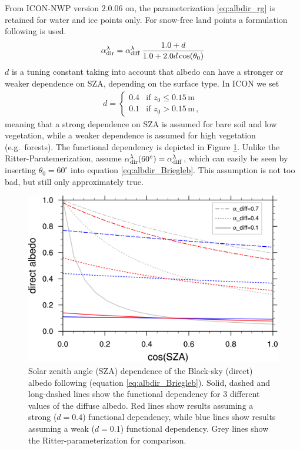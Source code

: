 \documentclass[a4paper,11pt]{article}
\begin{document}
From ICON-NWP version $2.0.06$ on, the parameterization \ref{eq:albdir_rg} is retained for water and ice points 
only. For snow-free land points a formulation following \cite{Briegleb82} is used.
\begin{align}
 \alpha_{\rm dir}^{\lambda} = \alpha_{\rm diff}^{\lambda}\, \frac{1.0 + d}{1.0 + 2.0 d \cos(\theta_{0})}\label{eq:albdir_Briegleb}
\end{align}
$d$ is a tuning constant taking into account that albedo can have a stronger or weaker dependence on SZA, depending on the surface 
type. In ICON we set
\begin{align}
 d= \begin{cases}
     0.4   &  \text{if $z_{0}\leq 0.15\,\mathrm{m}$}\\
     0.1   &  \text{if $z_{0} >  0.15\,\mathrm{m}$}\,,
    \end{cases}
\end{align}
meaning that a strong dependence on SZA is assumed for bare soil and low vegetation, while a weaker dependence is 
assumed for high vegetation (e.g.\ forests). The functional dependency is depicted in Figure \ref{fig:albdir_Briegleb}. 
Unlike the Ritter-Paratemerization, \cite{Briegleb82} assume 
$\alpha_{\rm dir}^{\lambda}(60^{\circ})= \alpha_{\rm diff}^{\lambda}$, which can easily be seen by inserting 
$\theta_{0}=60^{\circ}$ into equation \ref{eq:albdir_Briegleb}. This assumption is not too bad, but still only approximately true.
\begin{figure}[hbt]
  \centering
  \includegraphics[width=12.0cm]{direct_albedo_Briegleb.png}
  \caption{Solar zenith angle (SZA) dependence of the Black-sky (direct) albedo following \cite{Briegleb82} 
  (equation \ref{eq:albdir_Briegleb}). Solid, dashed and long-dashed lines show the functional dependency for $3$ 
  different values of the diffuse albedo. Red lines show results assuming a strong ($d=0.4$) functional dependency, 
  while blue lines show results assuming a weak ($d=0.1$) functional dependency. Grey lines show the Ritter-parameterization 
  for comparison.}\label{fig:albdir_Briegleb}
\end{figure}
\end{document}
